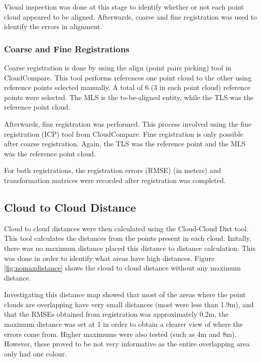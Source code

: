 \documentclass[man]{apa7}
\begin{document}
\begin{minipage}{\linewidth}
  \label{fig:manualAlignment}
\end{minipage}

Visual inspection was done at this stage to identify whether or not each point cloud appeared to be aligned. Afterwards, coarse and fine registration was used to identify the errors in alignment.

\subsubsection{Coarse and Fine Registrations}
Coarse registration is done by using the align (point pairs picking) tool in CloudCompare. This tool performs references one point cloud to the other using reference points selected manually. A total of 6 (3 in each point cloud) reference points were selected. The MLS is the to-be-aligned entity, while the TLS was the reference point cloud.

Afterwards, fine registration was performed. This process involved using the fine registration (ICP) tool from CloudCompare. Fine registration is only possible after coarse registration. Again, the TLS was the reference point and the MLS was the reference point cloud. 

For both registrations, the registration errors (RMSE) (in meters) and transformation matrices were recorded after registration was completed.

\subsection{Cloud to Cloud Distance}

Cloud to cloud distances were then calculated using the Cloud-Cloud Dist tool. This tool calculates the distances from the points present in each cloud. Initally, there was no maximum distance placed this distance to distance calculation. This was done in order to identify what areas have high distances. Figure \ref{fig:nomaxdistance} shows the cloud to cloud distance without any maximum distance. 


Investigating this distance map showed that most of the areas where the point clouds are overlapping have very small distances (most were less than 1.9m), and that the RMSEs obtained from registration was approximately 0.2m, the maximum distance was set at 1 in order to obtain a clearer view of where the errors come from. Higher maximums were also tested (such as 4m and 8m). However, these proved to be not very informative as the entire overlapping area only had one colour.
\end{document}
